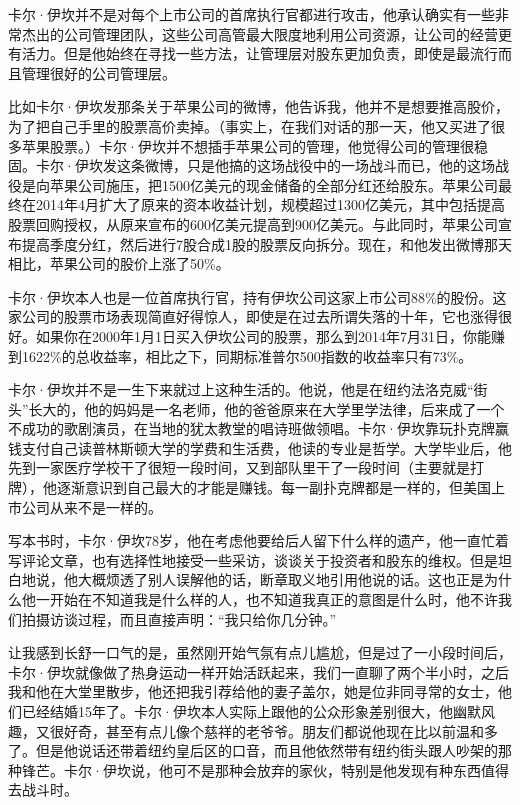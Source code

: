 卡尔·伊坎并不是对每个上市公司的首席执行官都进行攻击，他承认确实有一些非常杰出的公司管理团队，这些公司高管最大限度地利用公司资源，让公司的经营更有活力。但是他始终在寻找一些方法，让管理层对股东更加负责，即使是最流行而且管理很好的公司管理层。

比如卡尔·伊坎发那条关于苹果公司的微博，他告诉我，他并不是想要推高股价，为了把自己手里的股票高价卖掉。（事实上，在我们对话的那一天，他又买进了很多苹果股票。）卡尔·伊坎并不想插手苹果公司的管理，他觉得公司的管理很稳固。卡尔·伊坎发这条微博，只是他搞的这场战役中的一场战斗而已，他的这场战役是向苹果公司施压，把1500亿美元的现金储备的全部分红还给股东。苹果公司最终在2014年4月扩大了原来的资本收益计划，规模超过1300亿美元，其中包括提高股票回购授权，从原来宣布的600亿美元提高到900亿美元。与此同时，苹果公司宣布提高季度分红，然后进行7股合成1股的股票反向拆分。现在，和他发出微博那天相比，苹果公司的股价上涨了50\%。

卡尔·伊坎本人也是一位首席执行官，持有伊坎公司这家上市公司88\%的股份。这家公司的股票市场表现简直好得惊人，即使是在过去所谓失落的十年，它也涨得很好。如果你在2000年1月1日买入伊坎公司的股票，那么到2014年7月31日，你能赚到1622\%的总收益率，相比之下，同期标准普尔500指数的收益率只有73\%。

卡尔·伊坎并不是一生下来就过上这种生活的。他说，他是在纽约法洛克威“街头”长大的，他的妈妈是一名老师，他的爸爸原来在大学里学法律，后来成了一个不成功的歌剧演员，在当地的犹太教堂的唱诗班做领唱。卡尔·伊坎靠玩扑克牌赢钱支付自己读普林斯顿大学的学费和生活费，他读的专业是哲学。大学毕业后，他先到一家医疗学校干了很短一段时间，又到部队里干了一段时间（主要就是打牌），他逐渐意识到自己最大的才能是赚钱。每一副扑克牌都是一样的，但美国上市公司从来不是一样的。

写本书时，卡尔·伊坎78岁，他在考虑他要给后人留下什么样的遗产，他一直忙着写评论文章，也有选择性地接受一些采访，谈谈关于投资者和股东的维权。但是坦白地说，他大概烦透了别人误解他的话，断章取义地引用他说的话。这也正是为什么他一开始在不知道我是什么样的人，也不知道我真正的意图是什么时，他不许我们拍摄访谈过程，而且直接声明：“我只给你几分钟。”

让我感到长舒一口气的是，虽然刚开始气氛有点儿尴尬，但是过了一小段时间后，卡尔·伊坎就像做了热身运动一样开始活跃起来，我们一直聊了两个半小时，之后我和他在大堂里散步，他还把我引荐给他的妻子盖尔，她是位非同寻常的女士，他们已经结婚15年了。卡尔·伊坎本人实际上跟他的公众形象差别很大，他幽默风趣，又很好奇，甚至有点儿像个慈祥的老爷爷。朋友们都说他现在比以前温和多了。但是他说话还带着纽约皇后区的口音，而且他依然带有纽约街头跟人吵架的那种锋芒。卡尔·伊坎说，他可不是那种会放弃的家伙，特别是他发现有种东西值得去战斗时。

